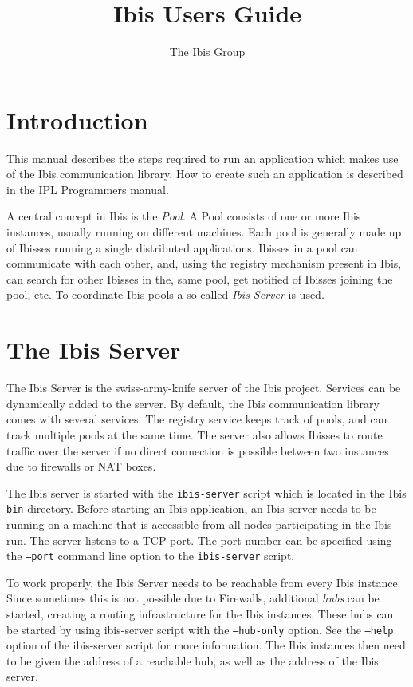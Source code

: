 \documentclass[10pt]{article}
\begin{document}
\title{Ibis Users Guide}

\author{The Ibis Group}

\maketitle

\section{Introduction}

This manual describes the steps required to run an application which makes
use of the Ibis communication library. How to create such an application
is described in the IPL Programmers manual.

A central concept in Ibis is the \emph{Pool}. A Pool consists of one or
more Ibis instances, usually running on different machines. Each pool is
generally made up of Ibisses running a single distributed applications.
Ibisses in a pool can communicate with each other, and, using the
registry mechanism present in Ibis, can search for other Ibisses in the,
same pool, get notified of Ibisses joining the pool, etc. To
coordinate Ibis pools a so called \emph{Ibis Server} is used.

\section{The Ibis Server}

The Ibis Server is the swiss-army-knife server of the Ibis project.
Services can be dynamically added to the server. By default, the Ibis
communication library comes with several services. The registry service
keeps track of pools, and can track multiple pools at the same time.
The server also allows Ibisses to route traffic over the server if no
direct connection is possible between two instances due to firewalls or
NAT boxes.

The Ibis server is started with the \texttt{ibis-server} script which is
located in the Ibis \texttt{bin} directory.  Before starting an Ibis
application, an Ibis server needs to be running on a machine that is
accessible from all nodes participating in the Ibis run. The server
listens to a TCP port. The port number can be specified using the
\texttt{--port} command line option to the \texttt{ibis-server} script.

To work properly, the Ibis Server needs to be reachable from every Ibis
instance. Since sometimes this is not possible due to Firewalls,
additional \emph{hubs} can be started, creating a routing infrastructure
for the Ibis instances. These hubs can be started by using ibis-server
script with the \texttt{--hub-only} option. See the \texttt{--help}
option of the ibis-server script for more information. The Ibis
instances then need to be given the address of a reachable hub, as well
as the address of the Ibis server.
\end{document}
